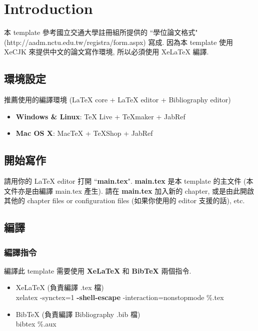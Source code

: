 \chapter{Introduction}
\label{chapter:intro}

本 template 參考國立交通大學註冊組所提供的 ``學位論文格式" (http://aadm.nctu.edu.tw/registra/form.aspx) 寫成.
因為本 template 使用 XeCJK 來提供中文的論文寫作環境, 所以必須使用 XeLaTeX 編譯.

\section{環境設定}

推薦使用的編譯環境 (LaTeX core + LaTeX editor + Bibliography editor)

\begin{itemize}
\item \textbf{Windows \& Linux}: TeX Live + TeXmaker + JabRef
\item \textbf{Mac OS X}: MacTeX + TeXShop + JabRef
\end{itemize}

\section{開始寫作}

請用你的 LaTeX editor 打開 ``\textbf{main.tex}".
\textbf{main.tex} 是本 template 的主文件 (本文件亦是由編譯 main.tex 產生).
請在 \textbf{main.tex} 加入新的 chapter, 或是由此開啟其他的 chapter files or configuration files (如果你使用的 editor 支援的話), etc.

\section{編譯}

\subsection{編譯指令}

編譯此 template 需要使用 \textbf{XeLaTeX} 和 \textbf{BibTeX} 兩個指令.

\begin{itemize}
\item XeLaTeX (負責編譯 .tex 檔)\\
xelatex -synctex=1 \textbf{-shell-escape} -interaction=nonstopmode \%.tex
\item BibTeX (負責編譯 Bibliography .bib 檔)\\
bibtex \%.aux
\end{itemize}

